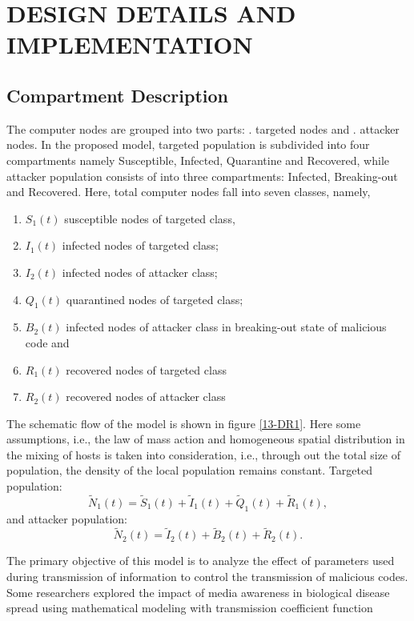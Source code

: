 
\chapter{DESIGN DETAILS AND IMPLEMENTATION}
\section{Compartment Description}

The computer nodes are grouped into two parts: . targeted nodes and . attacker nodes. In the proposed model, targeted population is subdivided into four compartments namely Susceptible, Infected, Quarantine and Recovered, while attacker population consists of into three compartments: Infected, Breaking-out and Recovered.
 Here, total computer nodes fall into seven classes, namely,
  \begin{enumerate}
    \item $S_1(t)$  susceptible nodes of targeted class,
    \item $I_1(t)$  infected nodes of targeted class;
    \item $I_2(t)$  infected nodes of attacker class;
    \item $Q_1(t)$  quarantined nodes of targeted class;
    \item $B_2(t)$  infected nodes of attacker class in breaking-out state of malicious code and
    \item $R_1(t)$  recovered nodes of targeted class
    \item $R_2(t)$  recovered nodes of attacker class
  \end{enumerate}
 The schematic flow of the model is shown in figure \ref{13-DR1}. Here some assumptions, i.e., the law of mass action and homogeneous spatial distribution in the mixing of hosts is taken into consideration, i.e., through out the total size of population, the density of the local population remains constant.
Targeted population:
\begin{equation} \tilde N_1(t) =\tilde S_1 (t)+\tilde I_1 (t)+\tilde Q_1 (t)+ \tilde R_1 (t), \end{equation} and attacker population:
\begin{equation}\tilde N_2(t) =\tilde I_2 (t) +\tilde B_2 (t) + \tilde R_2 (t) . \end{equation}
\par
The primary objective of this model is to analyze the effect of parameters used during transmission of information to control the transmission of malicious codes. Some researchers explored the impact of media awareness in biological disease spread using mathematical modeling with transmission coefficient function
